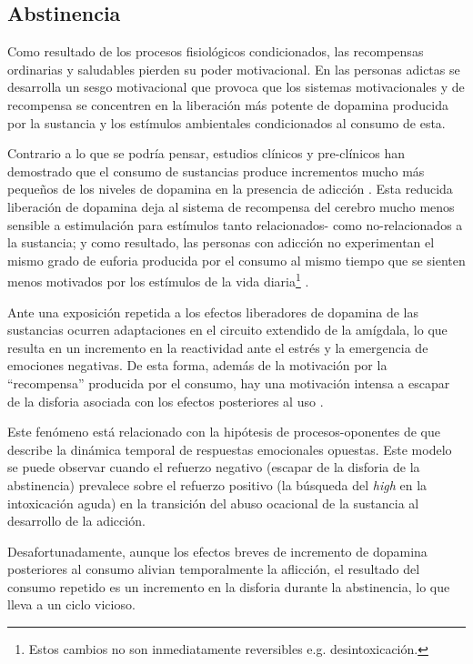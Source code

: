 \subsection{Abstinencia}
\label{abst}
Como resultado de los procesos fisiológicos condicionados, las recompensas ordinarias y saludables pierden su poder motivacional.
En las personas adictas se desarrolla un sesgo motivacional que provoca que los sistemas motivacionales y de recompensa se concentren en la liberación más potente de dopamina producida por la sustancia \textemdash{} y los estímulos ambientales condicionados al consumo de esta\parencite{Volkow2016}.\par
Contrario a lo que se podría pensar, estudios clínicos y pre-clínicos han demostrado que el consumo de sustancias produce incrementos mucho más pequeños de los niveles de dopamina en la presencia de adicción \parencite{Volkow1997,Zhang2013,Volkow2014}.
Esta reducida liberación de dopamina deja al sistema de recompensa del cerebro mucho menos sensible a estimulación para estímulos tanto relacionados- como no-relacionados a la sustancia; y como resultado, las personas con adicción no experimentan el mismo grado de euforia producida por el consumo al mismo tiempo que se sienten menos motivados por los estímulos de la vida diaria\footnote{Estos cambios no son inmediatamente reversibles e.g. desintoxicación.} \parencite{Volkow2016}.\par
Ante una exposición repetida a los efectos liberadores de dopamina de las sustancias ocurren adaptaciones en el circuito extendido de la amígdala, lo que resulta en un incremento en la reactividad ante el estrés y la emergencia de emociones negativas.
De esta forma, además de la motivación por la ``recompensa'' producida por el consumo, hay una motivación intensa a escapar de la disforia asociada con los efectos posteriores al uso \parencite{Goldstein2012a,Volkow2016}.\par
Este fenómeno está relacionado con la hipótesis de procesos-oponentes de \textcite{Solomon1978} que describe la dinámica temporal de respuestas emocionales opuestas.
Este modelo se puede observar cuando el refuerzo negativo (escapar de la disforia de la abstinencia) prevalece sobre el refuerzo positivo (la búsqueda del \textit{high} en la intoxicación aguda) en la transición del abuso ocacional de la sustancia al desarrollo de la adicción.\par
Desafortunadamente, aunque los efectos breves de incremento de dopamina posteriores al consumo alivian temporalmente la aflicción, el resultado del consumo repetido es un incremento en la disforia durante la abstinencia, lo que lleva a un ciclo vicioso.

